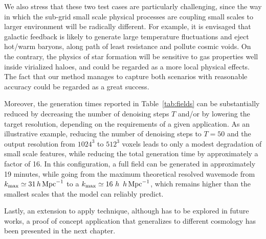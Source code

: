 We also stress that these two test cases are particularly challenging, since the way in which the sub-grid small scale physical processes are coupling small scales to larger environment will be radically different. For example, it is envisaged that galactic feedback is likely to generate large temperature fluctuations and eject hot/warm baryons, along path of least resistance and pollute cosmic voids. On the contrary, the physics of star formation will be sensitive to gas properties well inside virialized haloes, and could be regarded as a more local physical effects. The fact that our method manages to capture both scenarios with reasonable accuracy could be regarded as a great success.

Moreover, the generation times reported in
Table~\ref{tab:fields} can be substantially reduced by decreasing the number of denoising steps $T$ and/or by lowering the target resolution, depending on the requirements of a given application. As an illustrative example, reducing the number of denoising steps to $T=50$ and the output resolution from $1024^3$ to $512^3$ voxels leads to only a modest degradation of small scale features, while reducing the total generation time by approximately a factor of 16. In this configuration, a full field can be generated in approximately
19 minutes, while going from the maximum theoretical resolved wavemode from $k_\text{max}\simeq31\,h\,\mathrm{Mpc}^{-1}$ to a $k_\text{max}\simeq16~h~\,h\,\mathrm{Mpc}^{-1}$, which remains higher than the smallest scales that the model can reliably predict.

Lastly, an extension to apply \FOLD technique, although has to be explored in future works, a proof of concept application that generalizes to different cosmology has been presented in the next chapter.
